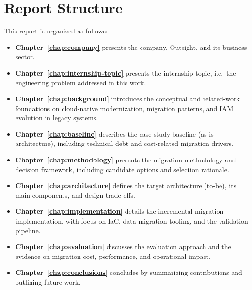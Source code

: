 \section{Report Structure}
\label{sec:report-structure}
This report is organized as follows:

\begin{itemize}
    \item \textbf{Chapter~\ref{chap:company}} presents the company, Outsight, and its business sector.
    \item \textbf{Chapter~\ref{chap:internship-topic}} presents the internship topic, i.e.\ the engineering problem addressed in this work.
    \item \textbf{Chapter~\ref{chap:background}} introduces the conceptual and related-work foundations on cloud-native modernization, migration patterns, and IAM evolution in legacy systems.
    \item \textbf{Chapter~\ref{chap:baseline}} describes the case-study baseline (as-is architecture), including technical debt and cost-related migration drivers.
    \item \textbf{Chapter~\ref{chap:methodology}} presents the migration methodology and decision framework, including candidate options and selection rationale.
    \item \textbf{Chapter~\ref{chap:architecture}} defines the target architecture (to-be), its main components, and design trade-offs.
    \item \textbf{Chapter~\ref{chap:implementation}} details the incremental migration implementation, with focus on IaC, data migration tooling, and the validation pipeline.
    \item \textbf{Chapter~\ref{chap:evaluation}} discusses the evaluation approach and the evidence on migration cost, performance, and operational impact.
    \item \textbf{Chapter~\ref{chap:conclusions}} concludes by summarizing contributions and outlining future work.
\end{itemize}
